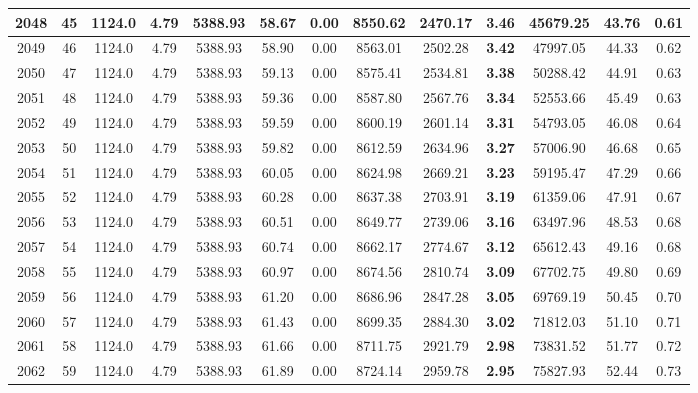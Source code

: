 {\begin{center}
\begin{tabular}[htb]{|c|c||c|c|c|c|c|c||c|c||c|c|c||}
\hline 
 2048 &  45 &  1124.0 &  4.79 &  5388.93 &  58.67 &  0.00 &  8550.62 &  2470.17 &  {\bf 3.46} &  45679.25 &  43.76 &  0.61 \\ 
\hline 
 2049 &  46 &  1124.0 &  4.79 &  5388.93 &  58.90 &  0.00 &  8563.01 &  2502.28 &  {\bf 3.42} &  47997.05 &  44.33 &  0.62 \\ 
\hline 
 2050 &  47 &  1124.0 &  4.79 &  5388.93 &  59.13 &  0.00 &  8575.41 &  2534.81 &  {\bf 3.38} &  50288.42 &  44.91 &  0.63 \\ 
\hline 
 2051 &  48 &  1124.0 &  4.79 &  5388.93 &  59.36 &  0.00 &  8587.80 &  2567.76 &  {\bf 3.34} &  52553.66 &  45.49 &  0.63 \\ 
\hline 
 2052 &  49 &  1124.0 &  4.79 &  5388.93 &  59.59 &  0.00 &  8600.19 &  2601.14 &  {\bf 3.31} &  54793.05 &  46.08 &  0.64 \\ 
\hline 
 2053 &  50 &  1124.0 &  4.79 &  5388.93 &  59.82 &  0.00 &  8612.59 &  2634.96 &  {\bf 3.27} &  57006.90 &  46.68 &  0.65 \\ 
\hline 
 2054 &  51 &  1124.0 &  4.79 &  5388.93 &  60.05 &  0.00 &  8624.98 &  2669.21 &  {\bf 3.23} &  59195.47 &  47.29 &  0.66 \\ 
\hline 
 2055 &  52 &  1124.0 &  4.79 &  5388.93 &  60.28 &  0.00 &  8637.38 &  2703.91 &  {\bf 3.19} &  61359.06 &  47.91 &  0.67 \\ 
\hline 
 2056 &  53 &  1124.0 &  4.79 &  5388.93 &  60.51 &  0.00 &  8649.77 &  2739.06 &  {\bf 3.16} &  63497.96 &  48.53 &  0.68 \\ 
\hline 
 2057 &  54 &  1124.0 &  4.79 &  5388.93 &  60.74 &  0.00 &  8662.17 &  2774.67 &  {\bf 3.12} &  65612.43 &  49.16 &  0.68 \\ 
\hline 
 2058 &  55 &  1124.0 &  4.79 &  5388.93 &  60.97 &  0.00 &  8674.56 &  2810.74 &  {\bf 3.09} &  67702.75 &  49.80 &  0.69 \\ 
\hline 
 2059 &  56 &  1124.0 &  4.79 &  5388.93 &  61.20 &  0.00 &  8686.96 &  2847.28 &  {\bf 3.05} &  69769.19 &  50.45 &  0.70 \\ 
\hline 
 2060 &  57 &  1124.0 &  4.79 &  5388.93 &  61.43 &  0.00 &  8699.35 &  2884.30 &  {\bf 3.02} &  71812.03 &  51.10 &  0.71 \\ 
\hline 
 2061 &  58 &  1124.0 &  4.79 &  5388.93 &  61.66 &  0.00 &  8711.75 &  2921.79 &  {\bf 2.98} &  73831.52 &  51.77 &  0.72 \\ 
\hline 
 2062 &  59 &  1124.0 &  4.79 &  5388.93 &  61.89 &  0.00 &  8724.14 &  2959.78 &  {\bf 2.95} &  75827.93 &  52.44 &  0.73 \\ 

\end{tabular}
\end{center}}

